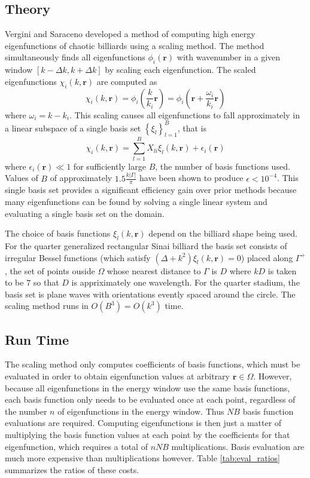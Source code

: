 \documentclass{report}
\newcommand{\rr}[0]{\mathbf{r}}
\begin{document}
\subsection{Theory}
Vergini and Saraceno \cite{vergini} developed a method of computing high energy eigenfunctions of chaotic billiards using a scaling method. The method simultaneously finds all eigenfunctions $\phi_{i}(\rr)$ with wavenumber in a given window $[k - \Delta k, k + \Delta k]$ by scaling each eigenfunction. The scaled eigenfunctions $\chi_{i}(k, \rr)$ are computed as
\[
\chi_{i}(k, \rr) = \phi_{i} \left( \frac{k}{k_{i}} \rr \right) = \phi_{i} \left( \rr + \frac{\omega_{i}}{k_i} \rr \right)
\]
where $\omega_{i} = k - k_i$. This scaling causes all eigenfunctions to fall approximately in a linear subspace of a single basis set $\left\{ \xi_{l} \right\}_{l=1}^{B}$, that is
\[
\chi_{i}(k, \rr) = \sum_{l=1}^{B} X_{li} \xi_{l}(k, \rr) + \epsilon_{i}(\rr)
\]
where $\epsilon_{i}(\rr) \ll 1$ for sufficiently large $B$, the number of basis functions used. Values of $B$ of approximately $1.5 \frac{k \vert \Gamma \vert}{\pi}$ have been shown to produce $\epsilon < 10^{-4}$. This single basis set provides a significant efficiency gain over prior methods because many eigenfunctions can be found by solving a single linear system and evaluating a single basis set on the domain.

The choice of basis functions $\xi_{l}(k, \rr)$ depend on the billiard shape being used. For the quarter generalized rectangular Sinai billiard the basis set consists of irregular Bessel functions (which satisfy $(\Delta + k^2)\xi_{l}(k, \rr) = 0$) placed along $\Gamma^{+}$, the set of points ouside $\Omega$ whose nearest distance to $\Gamma$ is $D$ where $kD$ is taken to be $7$ so that $D$ is appriximately one wavelength. For the quarter stadium, the basis set is plane waves with orientations evently spaced around the circle. The scaling method runs in $O(B^{3}) = O(k^{3})$ time. \cite{barnett}

\subsection{Run Time}
The scaling method only computes coefficients of basis functions, which must be evaluated in order to obtain eigenfunction values at arbitrary $\rr \in \Omega$. However, because all eigenfunctions in the energy window use the same basis functions, each basis function only needs to be evaluated once at each point, regardless of the number $n$ of eigenfunctions in the energy window. Thus $NB$ basis function evaluations are required. Computing eigenfunctions is then just a matter of multiplying the basis function values at each point by the coefficients for that eigenfunction, which requires a total of $nNB$ multiplications. Basis evaluation are much more expensive than multiplications however. Table \ref{tab:eval_ratios} summarizes the ratios of these costs.
\end{document}
